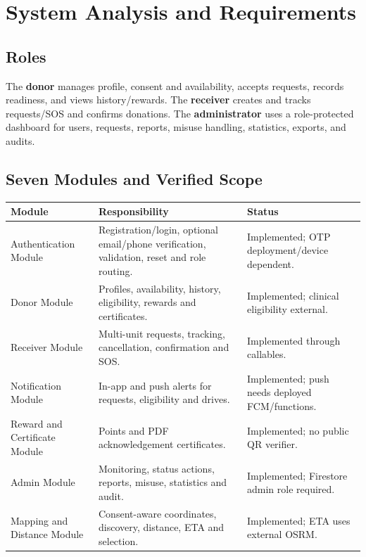 \chapter{System Analysis and Requirements}\label{ch:requirements}
\section{Roles}
The \textbf{donor} manages profile, consent and availability, accepts requests, records readiness, and views history/rewards. The \textbf{receiver} creates and tracks requests/SOS and confirms donations. The \textbf{administrator} uses a role-protected dashboard for users, requests, reports, misuse handling, statistics, exports, and audits.
\section{Seven Modules and Verified Scope}
\begin{longtable}{p{3.5cm}p{7.2cm}p{2.8cm}}\toprule Module&Responsibility&Status\\\midrule\endhead
Authentication Module&Registration/login, optional email/phone verification, validation, reset and role routing.&Implemented; OTP deployment/device dependent.\\
Donor Module&Profiles, availability, history, eligibility, rewards and certificates.&Implemented; clinical eligibility external.\\
Receiver Module&Multi-unit requests, tracking, cancellation, confirmation and SOS.&Implemented through callables.\\
Notification Module&In-app and push alerts for requests, eligibility and drives.&Implemented; push needs deployed FCM/functions.\\
Reward and Certificate Module&Points and PDF acknowledgement certificates.&Implemented; no public QR verifier.\\
Admin Module&Monitoring, status actions, reports, misuse, statistics and audit.&Implemented; Firestore admin role required.\\
Mapping and Distance Module&Consent-aware coordinates, discovery, distance, ETA and selection.&Implemented; ETA uses external OSRM.\\\bottomrule
\end{longtable}
